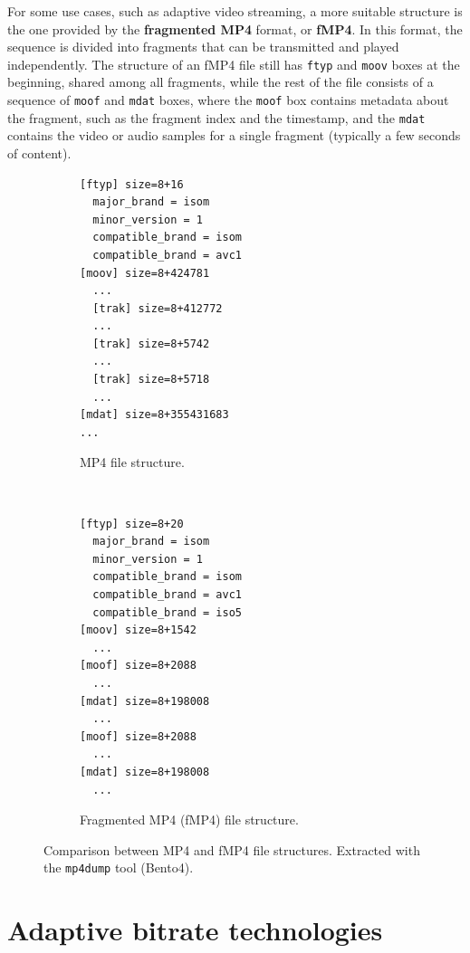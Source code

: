 For some use cases, such as adaptive video streaming, a more suitable structure is the one provided by the \textbf{fragmented MP4} format, or \textbf{fMP4}. In this format, the sequence is divided into fragments that can be transmitted and played independently. The structure of an fMP4 file still has \texttt{ftyp} and \texttt{moov} boxes at the beginning, shared among all fragments, while the rest of the file consists of a sequence of \texttt{moof} and \texttt{mdat} boxes, where the \texttt{moof} box contains metadata about the fragment, such as the fragment index and the timestamp, and the \texttt{mdat} contains the video or audio samples for a single fragment (typically a few seconds of content).

\begin{figure}
	\centering
	
	\begin{subfigure}[t]{0.45\textwidth}
		\centering
		\begin{verbatim}
[ftyp] size=8+16
  major_brand = isom
  minor_version = 1
  compatible_brand = isom
  compatible_brand = avc1
[moov] size=8+424781
  ...
  [trak] size=8+412772
  ...
  [trak] size=8+5742
  ...
  [trak] size=8+5718
  ...
[mdat] size=8+355431683
...
		\end{verbatim}
		\caption{MP4 file structure.}
		\label{fig:mp4dump_progressive}
	\end{subfigure}%
	~ 
	\begin{subfigure}[t]{0.45\textwidth}
		\centering
		\begin{verbatim}
[ftyp] size=8+20
  major_brand = isom
  minor_version = 1
  compatible_brand = isom
  compatible_brand = avc1
  compatible_brand = iso5
[moov] size=8+1542
  ...
[moof] size=8+2088
  ...
[mdat] size=8+198008
  ...
[moof] size=8+2088
  ...
[mdat] size=8+198008
  ...
		\end{verbatim}
		\caption{Fragmented MP4 (fMP4) file structure.}
		\label{fig:mp4dump_fragmented}
	\end{subfigure}
	
	\caption{Comparison between MP4 and fMP4 file structures. Extracted with the \texttt{mp4dump} tool (Bento4).}
	\label{fig:mp4dump}
\end{figure}


\section{Adaptive bitrate technologies}
\label{sec:bg/abr}

